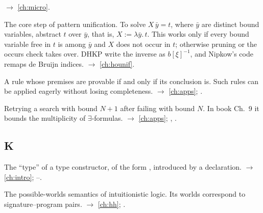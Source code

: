 \begin{glossarylist}
  $\rightarrow$ \cref{ch:micro}.
\item[Inversion of a pattern substitution] The core step of pattern unification. To solve $X\,\bar y = t$, where
  $\bar y$ are distinct bound variables, abstract $t$ over $\bar y$, that is, $X:=\lambda\bar y.\,t$. This works only
  if every bound variable free in $t$ is among $\bar y$ and $X$ does not occur in $t$; otherwise pruning or the occurs
  check takes over. DHKP write the inverse as $b[\xi]^{-1}$, and Nipkow's code remaps de Bruijn indices.
  $\rightarrow$ \cref{ch:hounif}.
\item[Invertible rule] A rule whose premises are provable if and only if its conclusion is. Such rules can be
  applied eagerly without losing completeness. $\rightarrow$ \cref{ch:apps}; .
\item[Iterative deepening] Retrying a search with bound $N+1$ after failing with bound $N$. In book Ch.~9 it bounds
  the multiplicity of $\exists$-formulas. $\rightarrow$ \cref{ch:apps}; , .
\end{glossarylist}

\subsection*{K}
\begin{glossarylist}
\item[Kind] The \enquote{type} of a type constructor, of the form , introduced by a
   declaration. $\rightarrow$ \cref{ch:intro}; --.
\item[Kripke model] The possible-worlds semantics of intuitionistic logic. Its worlds correspond to
  signature--program pairs. $\rightarrow$ \cref{ch:hh}; .
\end{glossarylist}

